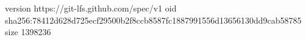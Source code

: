 version https://git-lfs.github.com/spec/v1
oid sha256:78412d628d725ecf29500b2f8ccb8587fc1887991556d13656130dd9cab58785
size 1398236
